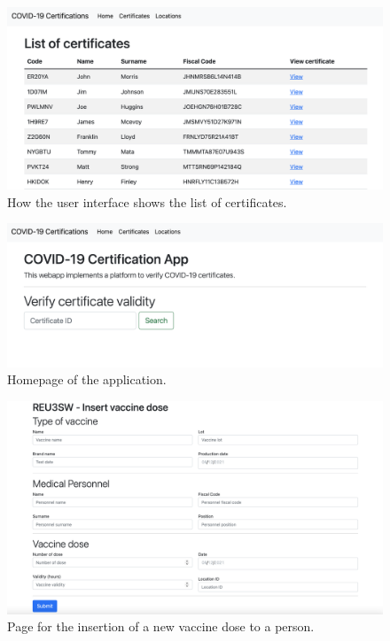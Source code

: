 \documentclass{article}
\begin{document}
\begin{figure}[ht!]
    \centering
    \includegraphics[scale=0.3]{screenshots/certificatelist.png}
    \caption{How the user interface shows the list of certificates.}
\end{figure}
\begin{figure}[ht!]
    \centering
    \includegraphics[scale=0.3]{screenshots/homepage.png}
    \caption{Homepage of the application.}
\end{figure}
\begin{figure}[ht!]
    \centering
    \includegraphics[scale=0.3]{screenshots/insertvaccine.png}
    \caption{Page for the insertion of a new vaccine dose to a person.}
\end{figure}
\end{document}
